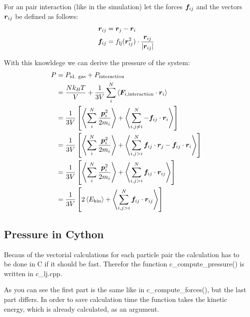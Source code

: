 For an pair interaction (like in the simulation) let the forces $\boldsymbol{f}_{ij}$ and the vectors $\boldsymbol{r}_{ij}$ be defined as follows:
\begin{align}
\boldsymbol{r}_{ij}
	&=\boldsymbol{r}_{j} - \boldsymbol{r}_{i}
	\label{4rij}\\
\boldsymbol{f}_{ij} 
	&= f_\text{lj}(\boldsymbol{r}_{ij}^2)\cdot\frac{\boldsymbol{r}_{ij}}{\left| \boldsymbol{r}_{ij}\right|}
	\label{4fij}
\end{align}

With this knowldege we can derive the pressure of the system:
\begin{align}
P
	&=P_\text{id. gas} + P_\text{interaction}
	\label{4p4}\\
	&=\frac{Nk_BT}{V} + \frac{1}{3V}\sum_i^N\left\langle\boldsymbol{F}_{i,\text{interaction}}\cdot\boldsymbol{r}_i\right\rangle
	\label{4p5}\\
	&=\frac{1}{3V}\left[\left\langle\sum_i^N\frac{\boldsymbol{p}_i^2}{2m_i}\right\rangle + \left\langle\sum_{i,j\neq i}^N-\boldsymbol{f}_{ij}\cdot\boldsymbol{r}_i\right\rangle\right]
	\label{4p6}\\
	&=\frac{1}{3V}\left[\left\langle\sum_i^N\frac{\boldsymbol{p}_i^2}{2m_i}\right\rangle + \left\langle\sum_{i,j>i}^N\boldsymbol{f}_{ij}\cdot\boldsymbol{r}_{j}-\boldsymbol{f}_{ij}\cdot\boldsymbol{r}_{i}\right\rangle\right]
	\label{4p7}\\
	&=\frac{1}{3V}\left[\left\langle\sum_i^N\frac{\boldsymbol{p}_i^2}{2m_i}\right\rangle + \left\langle\sum_{i,j>i}^N\boldsymbol{f}_{ij}\cdot\boldsymbol{r}_{ij}\right\rangle\right]
	\label{4p8}\\
	&=\frac{1}{3V}\left[ 2\left\langle E_\text{kin}\right\rangle + \left\langle\sum_{i,j>i}^N\boldsymbol{f}_{ij}\cdot\boldsymbol{r}_{ij}\right\rangle\right]
	\label{4p9}
\end{align}

\subsection*{Pressure in Cython}

Becaus of the vectorial calculations for each particle pair the calculation has to be done in C if it should be fast. 
Therefor the function c\_compute\_pressure() is written in c\_lj.cpp.


As you can see the first part is the same like in c\_compute\_forces(), but the last part differs.
In order to save calculation time the function takes the kinetic energy, which is already calculated, as an argument.